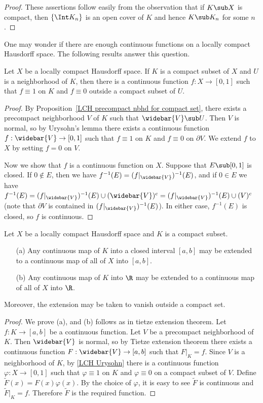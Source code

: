 \begin{proof}
These assertions follow easily from the observation that if $K\sub X$ is compact, then $\{\Int K_n\}$ is an open cover of $K$ and hence $K\sub K_n$ for some $n$.
\end{proof}
One may wonder if there are enough continuous functions on a locally compact Hausdorff space. The following results answer this question.
\begin{proposition}\label{LCH Urysohn}
Let $X$ be a locally compact Hausdorff space. If $K$ is a compact subset of $X$ and $U$ is a neighborhood of $K$, then there is a continuous function $f:X\to[0,1]$ such that $f\equiv 1$ on $K$ and $f\equiv 0$ outside a compact subset of $U$.
\end{proposition}
\begin{proof}
By Proposition~\ref{LCH precompact nbhd for compact set}, there exists a precompact neighborhood $V$ of $K$ such that $\widebar{V}\sub U$. Then $V$ is normal, so by Urysohn's lemma there exists a continuous function $f:\widebar{V}\to[0,1]$ such that $f\equiv 1$ on $K$ and $f\equiv 0$ on $\partial V$. We extend $f$ to $X$ by setting $f=0$ on $V$.\par
Now we show that $f$ is a continuous function on $X$. Suppose that $E\sub[0,1]$ is closed. If $0\notin E$, then we have $f^{-1}(E)=(f|_{\widebar{V}})^{-1}(E)$, and if $0\in E$ we have $f^{-1}(E)=(f|_{\widebar{V}})^{-1}(E)\cup(\widebar{V})^c=(f|_{\widebar{V}})^{-1}(E)\cup(V)^c$ (note that $\partial V$ is contained in $(f|_{\widebar{V}})^{-1}(E)$). In either case, $f^{-1}(E)$ is closed, so $f$ is continuous. 
\end{proof}
\begin{proposition}\label{LCH Tietze Extension}
Let $X$ be a locally compact Hausdorff space and $K$ is a compact subset.
\begin{itemize}
\item[(a)] Any continuous map of $K$ into a closed interval $[a,b]$ may be extended to a continuous map of all of $X$ into $[a,b]$.
\item[(b)] Any continuous map of $K$ into $\R$ may be extended to a continuous map of all of $X$ into $\R$.
\end{itemize}
Moreover, the extension may be taken to vanish outside a compact set.
\end{proposition}
\begin{proof}
We prove (a), and (b) follows as in tietze extension theorem. Let $f:K\to[a,b]$ be a continuous function. Let $V$ be a precompact neighborhood of $K$. Then $\widebar{V}$ is normal, so by Tietze extension theorem there exists a continuous function $F:\widebar{V}\to[a,b]$ such that $F|_K=f$. Since $V$ is a neighborhood of $K$, by \ref{LCH Urysohn} there is a continuous function $\varphi:X\to[0,1]$ such that $\varphi\equiv 1$ on $K$ and $\varphi\equiv 0$ on a compact subset of $V$. Define $\widetilde{F}(x)=F(x)\varphi(x)$. By the choice of $\varphi$, it is easy to see $\widetilde{F}$ is continuous and $\widetilde{F}|_K=f$. Therefore $\widetilde{F}$ is the required function.
\end{proof}
